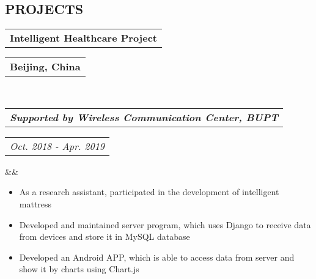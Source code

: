 \documentclass[11pt,a4paper,palatine]{moderncv}        %
\makeatletter
\newcommand*{\customcventry}[7][.25em]{
  \begin{tabular}{@{}l} 
    {\bfseries #4}
  \end{tabular}
  \hfill%
  \begin{tabular}{l@{}}
     {\bfseries #5}
  \end{tabular} \\
  \begin{tabular}{@{}l} 
    {\itshape #3}
  \end{tabular}
  \hfill%
  \begin{tabular}{l@{}}
     {\itshape #2}
  \end{tabular}
  \ifx&#7&%
  \else{\\%
    \begin{minipage}{\maincolumnwidth}%
      \small#7%
    \end{minipage}}\fi%
  \par\addvspace{#1}}
\newcommand*{\customcvproject}[4][.25em]{
  \begin{tabular}{@{}l} 
    {\bfseries #2}
  \end{tabular}
  \hfill%
  \begin{tabular}{l@{}}
     {\itshape #3}
  \end{tabular}
  \ifx&#4&%
  \else{\\%
    \begin{minipage}{\maincolumnwidth}%
      \small#4%
    \end{minipage}}\fi%
  \par\addvspace{#1}}
\makeatother
\begin{document}
\begin{CJK*}{UTF8}{gbsn}
\section{PROJECTS}



{\customcventry{Oct. 2018 - Apr. 2019}{\textbf{Supported by Wireless Communication Center, BUPT}}{Intelligent Healthcare Project}{Beijing, China}{}{}}
  {\begin{itemize}
    \item As a research assistant, participated in the development of intelligent mattress
    \item Developed and maintained server program, which uses Django to receive data from devices and store it in MySQL database
    \item Developed an Android APP, which is able to access data from server and show it by charts using Chart.js
  \end{itemize}
}


\end{CJK*}
\end{document}
